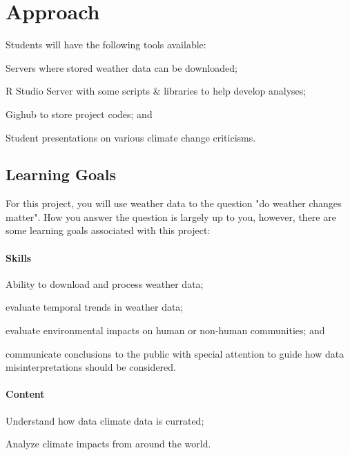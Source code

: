 \documentclass{article}\usepackage[]{graphicx}\usepackage[]{color}
\newenvironment{itemize*}%
  {\begin{itemize}%
    \setlength{\itemsep}{0pt}%
    \setlength{\parskip}{0pt}}%
  {\end{itemize}}
\begin{document}
\section{Approach}

Students will have the following tools available:

\begin{itemize*}
  \item Servers where stored weather data can be downloaded;
  \item R Studio Server with some scripts \& libraries to help develop analyses;
  \item Gighub to store project codes; and
  \item Student presentations on various climate change criticisms. 
\end{itemize*}

\subsection{Learning Goals}

For this project, you will use weather data to the question "do weather changes matter". How you answer the question is largely up to you, however, there are some learning goals associated with this project:

\paragraph{Skills}

\begin{itemize*}
  \item Ability to download and process weather data;
  \item evaluate temporal trends in weather data;
  \item evaluate environmental impacts on human or non-human communities; and
  \item communicate conclusions to the public with special attention to guide how data misinterpretations should be considered.
\end{itemize*}

\paragraph{Content}
\begin{itemize*}
  \item Understand how data climate data is currated;
  \item Analyze climate impacts from around the world.
\end{itemize*}
\end{document}
